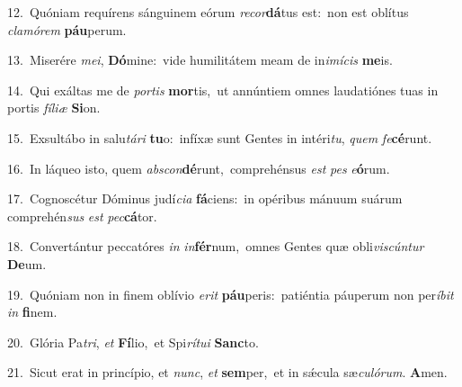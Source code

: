 {\numbfont\textcolor{\numbcolor}{12.}}~Quóniam requírens sánguinem eórum \textit{re}\-\textit{cor}\textbf{dá}tus est:~\star non est oblítus \textit{cla}\-\textit{mó}\textit{rem} \textbf{páu}\-perum.\par
{\numbfont\textcolor{\numbcolor}{13.}}~Miserére \textit{me}\-\textit{i}, \textbf{Dó}\-mine:~\star vide humilitátem meam de in\-\textit{i}\-\textit{mí}\textit{cis} \textbf{me}\-is.\par
{\numbfont\textcolor{\numbcolor}{14.}}~Qui exáltas me de \textit{por}\-\textit{tis} \textbf{mor}\-tis,~\star ut annúntiem omnes laudatiónes tuas in portis \textit{fí}\-\textit{li}\textit{æ} \textbf{Si}\-on.\par
{\numbfont\textcolor{\numbcolor}{15.}}~Exsultábo in salu\-\textit{tá}\-\textit{ri} \textbf{tu}\-o:~\star infíxæ sunt Gentes in intéri\-\textit{tu}\-, \textit{quem} \textit{fe}\-\textbf{cé}runt.\par
{\numbfont\textcolor{\numbcolor}{16.}}~In láqueo isto, quem \textit{abs}\-\textit{con}\textbf{dé}runt,~\star comprehénsus \textit{est} \textit{pes} \textit{e}\-\textbf{ó}rum.\par
{\numbfont\textcolor{\numbcolor}{17.}}~Cognoscétur Dóminus judí\-\textit{ci}\-\textit{a} \textbf{fá}\-ciens:~\star in opéribus mánuum suárum comprehén\textit{sus} \textit{est} \textit{pec}\-\textbf{cá}tor.\par
{\numbfont\textcolor{\numbcolor}{18.}}~Convertántur peccatóres \textit{in} \textit{in}\-\textbf{fér}num,~\star omnes Gentes quæ obli\-\textit{vis}\-\textit{cún}\textit{tur} \textbf{De}\-um.\par
{\numbfont\textcolor{\numbcolor}{19.}}~Quóniam non in finem oblívio \textit{e}\-\textit{rit} \textbf{páu}\-peris:~\star patiéntia páuperum non per\-\textit{í}\-\textit{bit} \textit{in} \textbf{fi}\-nem.\par
{\numbfont\textcolor{\numbcolor}{20.}}~Glória Pa\-\textit{tri}\-, \textit{et} \textbf{Fí}\-lio,~\star et Spi\-\textit{rí}\-\textit{tu}\textit{i} \textbf{Sanc}\-to.\par
{\numbfont\textcolor{\numbcolor}{21.}}~Sicut erat in princípio, et \textit{nunc}\-, \textit{et} \textbf{sem}\-per,~\star et in sǽcula sæ\-\textit{cu}\-\textit{ló}\textit{rum}. \textbf{A}\-men.\par
